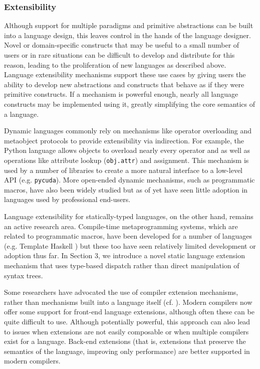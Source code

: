 \subsubsection{Extensibility}\label{extensions}

Although support for multiple paradigms and primitive abstractions can be built into a language design, this leaves control in the hands of the language designer. Novel or domain-specific constructs that may be useful to a small number of users or in rare situations can be difficult to develop and distribute for this reason, leading to the proliferation of new languages as  described above. Language extensibility mechanisms support these use cases by giving users the ability to develop new abstractions and constructs that behave as if they were primitive constructs. If a mechanism is powerful enough, nearly all language constructs may be implemented using it, greatly simplifying the core semantics of a language.

Dynamic languages commonly rely on mechanisms like operator overloading and metaobject protocols \cite{Kiczales91} to provide extensibility via indirection. For example, the Python language allows objects to overload nearly every operator and as well as operations like attribute lookup (\verb|obj.attr|) and assignment. This mechanism is used by a number of libraries to create a more natural interface to a low-level API (e.g. \verb|pycuda|). More open-ended dynamic mechanisms, such as programmatic macros, have also been widely studied but as of yet have seen little adoption in languages used by professional end-users. 

Language extensibility for statically-typed languages, on the other hand, remains an active research area. Compile-time metaprogramming systems, which are related to programmatic macros, have been developed for a number of languages (e.g. Template Haskell \cite{sheard2002template}) but these too have seen relatively limited development or adoption thus far. In Section 3, we introduce a novel static language extension mechanism that uses type-based dispatch rather than direct manipulation of syntax trees.

Some researchers have advocated the use of compiler extension mechanisms, rather than mechanisms built into a language itself (cf. \cite{clements2008comparison}). Modern compilers now offer some support for front-end language extensions, although often these  can be quite difficult to use.  Although potentially powerful, this approach can also lead to issues when extensions are not easily composable or when multiple compilers exist for a language. Back-end extensions (that is, extensions that preserve the semantics of the language, improving only performance) are better supported in modern compilers.

